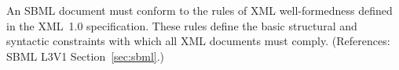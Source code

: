 An SBML document must conform to the rules of XML well-formedness defined
in the XML~1.0 specification.  These rules define the basic structural and
syntactic constraints with which all XML documents must comply.
(References: SBML L3V1 Section~\ref{sec:sbml}.)
